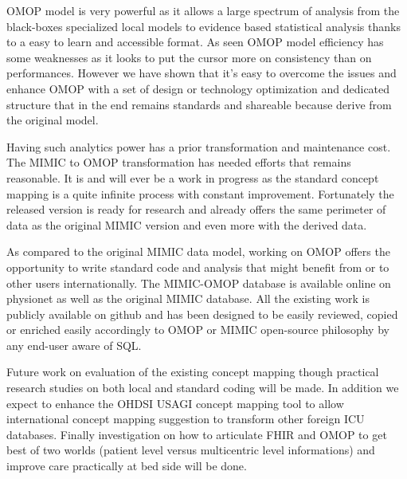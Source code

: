 OMOP model is very powerful as it allows a large spectrum of analysis from the
black-boxes specialized local models to evidence based statistical analysis
thanks to a easy to learn and accessible format. As seen OMOP model efficiency
has some weaknesses as it looks to put the cursor more on consistency than on
performances. However we have shown that it's easy to overcome the issues and
enhance OMOP with a set of design or technology optimization and dedicated
structure that in the end remains standards and shareable because derive from
the original model.

Having such analytics power has a prior transformation and maintenance cost.
The MIMIC to OMOP transformation has needed efforts that remains reasonable. It
is and will ever be a work in progress as the standard concept mapping is a
quite infinite process with constant improvement. Fortunately the released
version is ready for research and already offers the same perimeter of data as
the original MIMIC version and even more with the derived data.

As compared to the original MIMIC data model, working on OMOP offers the
opportunity to write standard code and analysis that might benefit from or to
other users internationally. The MIMIC-OMOP database is available online on
physionet as well as the original MIMIC database. All the existing work is
publicly available on github \cite{mimic-omop-github} and has been designed to
be easily reviewed, copied or enriched easily accordingly to OMOP or MIMIC
open-source philosophy by any end-user aware of SQL.

Future work on evaluation of the existing concept mapping though practical
research studies on both local and standard coding will be made. In addition we
expect to enhance the OHDSI USAGI concept mapping tool to allow international
concept mapping suggestion to transform other foreign ICU databases. Finally
investigation on how to articulate FHIR and OMOP to get best of two worlds
(patient level versus multicentric level informations) and improve care
practically at bed side will be done.
